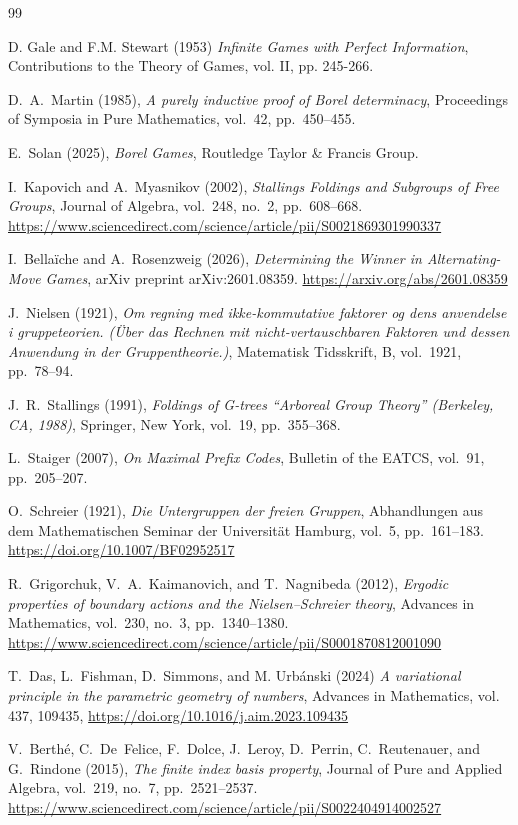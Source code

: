 \documentclass[a4,12pt]{article}%
\begin{document}
\begin{thebibliography}{99}

 D. Gale and F.M. Stewart (1953) \textit{Infinite Games with Perfect Information}, Contributions to the Theory of Games, vol. II, pp. 245-266.

D.~A.~Martin (1985),
\textit{A purely inductive proof of Borel determinacy},
Proceedings of Symposia in Pure Mathematics, vol.~42, pp.~450--455.

E.~Solan (2025),
\textit{Borel Games},
Routledge Taylor \& Francis Group.

I.~Kapovich and A.~Myasnikov (2002),
\textit{Stallings Foldings and Subgroups of Free Groups},
Journal of Algebra, vol.~248, no.~2, pp.~608--668.
\url{https://www.sciencedirect.com/science/article/pii/S0021869301990337}

I.~Bellaïche and A.~Rosenzweig (2026),
\textit{Determining the Winner in Alternating-Move Games},
arXiv preprint arXiv:2601.08359.
\url{https://arxiv.org/abs/2601.08359}


J.~Nielsen (1921),
\textit{Om regning med ikke-kommutative faktorer og dens anvendelse i gruppeteorien. ({\"U}ber das {Rechnen} mit nicht-vertauschbaren {Faktoren} und dessen {Anwendung} in der {Gruppentheorie}.)},
Matematisk Tidsskrift, B, vol.~1921, pp.~78--94.


J.~R.~Stallings (1991),
\textit{Foldings of G-trees “Arboreal Group Theory” (Berkeley, CA, 1988)},
Springer, New York, vol.~19, pp.~355--368.


L.~Staiger (2007),
\textit{On Maximal Prefix Codes},
Bulletin of the EATCS, vol.~91, pp.~205--207.

O.~Schreier (1921),
\textit{Die Untergruppen der freien Gruppen},
Abhandlungen aus dem Mathematischen Seminar der Universit\"at Hamburg, vol.~5, pp.~161--183.
\url{https://doi.org/10.1007/BF02952517}


R.~Grigorchuk, V.~A.~Kaimanovich, and T.~Nagnibeda (2012),
\textit{Ergodic properties of boundary actions and the Nielsen–Schreier theory},
Advances in Mathematics, vol.~230, no.~3, pp.~1340--1380.
\url{https://www.sciencedirect.com/science/article/pii/S0001870812001090}

 T.~Das, L.~Fishman, D.~Simmons, and M. Urb\'{a}nski (2024) \textit{A variational principle in the parametric geometry of numbers}, Advances in Mathematics, vol. 437, 109435, \url{https://doi.org/10.1016/j.aim.2023.109435}


V.~Berthé, C.~De~Felice, F.~Dolce, J.~Leroy, D.~Perrin, C.~Reutenauer, and G.~Rindone (2015),
\textit{The finite index basis property},
Journal of Pure and Applied Algebra, vol.~219, no.~7, pp.~2521--2537.
\url{https://www.sciencedirect.com/science/article/pii/S0022404914002527}

\end{thebibliography}
\end{document}
